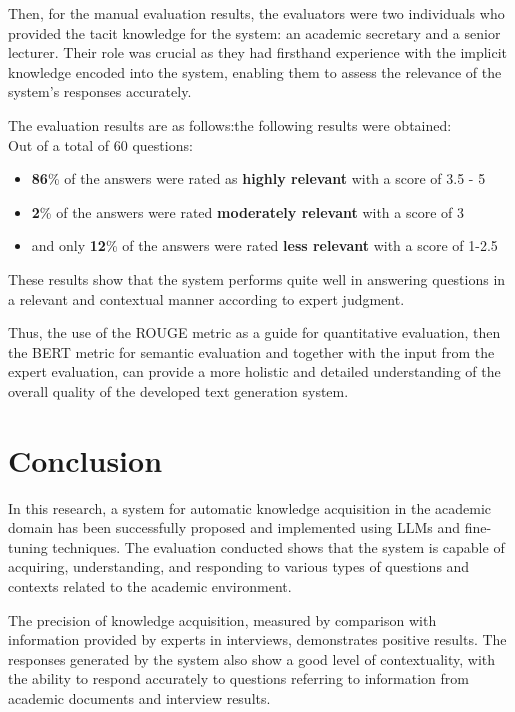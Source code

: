 \documentclass[runningheads]{llncs}
\begin{document}
Then, for the manual evaluation results, the evaluators were two individuals who provided the tacit knowledge for the system: an academic secretary and a senior lecturer. Their role was crucial as they had firsthand experience with the implicit knowledge encoded into the system, enabling them to assess the relevance of the system's responses accurately.

The evaluation results are as follows:the following results were obtained: \\
Out of a total of 60 questions:
\begin{itemize}
    \item \textbf{86}\% of the answers were rated as \textbf{highly relevant} with a score of 3.5 - 5
    \item \textbf{2}\% of the answers were rated \textbf{moderately relevant} with a score of 3
    \item and only \textbf{12}\% of the answers were rated \textbf{less relevant} with a score of 1-2.5
\end{itemize}

These results show that the system performs quite well in answering questions in a relevant and contextual manner according to expert judgment.

Thus, the use of the ROUGE metric as a guide for quantitative evaluation, then the BERT metric for semantic evaluation and together with the input from the expert evaluation, can provide a more holistic and detailed understanding of the overall quality of the developed text generation system.

\section{Conclusion}
In this research, a system for automatic knowledge acquisition in the academic domain has been successfully proposed and implemented using LLMs and fine-tuning techniques. The evaluation conducted shows that the system is capable of acquiring, understanding, and responding to various types of questions and contexts related to the academic environment.

The precision of knowledge acquisition, measured by comparison with information provided by experts in interviews, demonstrates positive results. The responses generated by the system also show a good level of contextuality, with the ability to respond accurately to questions referring to information from academic documents and interview results.
\end{document}
